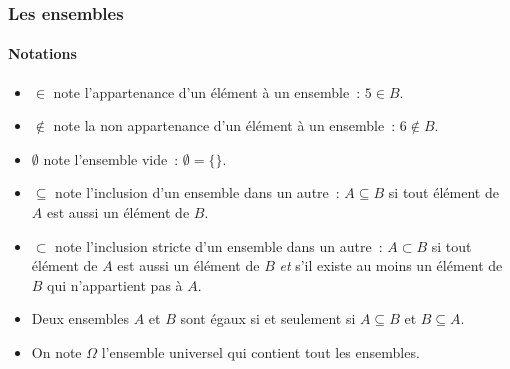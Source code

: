 \documentclass[10pt,notheorems]{beamer}
\theoremstyle{plain}
\theoremstyle{definition} %
\begin{document}
\begin{frame}
  \frametitle{Les ensembles}
  \framesubtitle{Notations}
  
  \begin{itemize}

    \item $\in$ note l'appartenance d'un élément à un ensemble : $5\in B$.\newline

    \item $\notin$ note la non appartenance d'un élément à un ensemble : $6\notin B$.\newline

    \item $\emptyset$ note l'ensemble vide : $\emptyset = \{\}$.\newline

    \item $\subseteq$ note l'inclusion d'un ensemble dans un autre : $ A \subseteq B $ si tout élément de $A$ est aussi un élément de $B$.\newline

    \item $\subset$ note l'inclusion stricte d'un ensemble dans un autre : $ A \subset B $ si tout élément de $A$ est aussi un élément de $B$ \emph{et} s'il existe au moins un élément de $B$ qui n'appartient pas à $A$.\newline

    \item Deux ensembles $A$ et $B$ sont égaux si et seulement si $A\subseteq B$ et $B\subseteq A$.\newline

    \item On note $\Omega$ l'ensemble universel qui contient tout les ensembles. 
      
  \end{itemize}

\end{frame}
\end{document}
